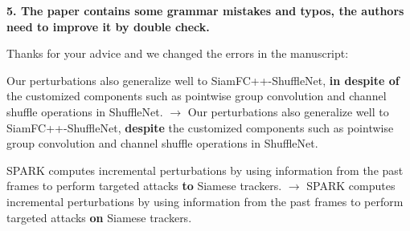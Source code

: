 \documentclass[12pt]{article}
\begin{document}
\noindent \textbf{5. The paper contains some grammar mistakes and typos, the authors need to improve it by double check.}

Thanks for your advice and we changed the errors in the manuscript:

Our perturbations also generalize well to SiamFC++-ShuffleNet, \textbf{in despite of} the customized components such as pointwise group convolution and channel shuffle operations in ShuffleNet. $\rightarrow$ Our perturbations also generalize well to SiamFC++-ShuffleNet, \textbf{despite} the customized components such as pointwise group convolution and channel shuffle operations in ShuffleNet.

SPARK computes incremental perturbations by using information from the past frames to perform targeted attacks \textbf{to} Siamese trackers. $\rightarrow$ SPARK computes incremental perturbations by using information from the past frames to perform targeted attacks \textbf{on} Siamese trackers.



\end{document}
